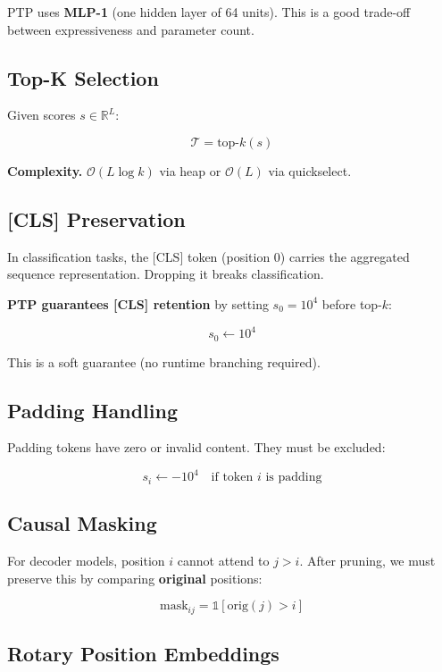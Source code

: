 PTP uses \textbf{MLP-1} (one hidden layer of 64 units). This is a good 
trade-off between expressiveness and parameter count.

\subsection{Top-K Selection}

Given scores $s \in \mathbb{R}^L$:

\[
\mathcal{T} = \text{top-}k(s)
\tag{3.4}
\]

\textbf{Complexity.} $\mathcal{O}(L \log k)$ via heap or $\mathcal{O}(L)$ via 
quickselect.

\subsection{[CLS] Preservation}

In classification tasks, the [CLS] token (position 0) carries the 
aggregated sequence representation. Dropping it breaks classification.

\textbf{PTP guarantees [CLS] retention} by setting $s_0 = 10^4$ before top-$k$:

\[
s_0 \leftarrow 10^4
\tag{3.5}
\]

This is a soft guarantee (no runtime branching required).

\subsection{Padding Handling}

Padding tokens have zero or invalid content. They must be excluded:

\[
s_i \leftarrow -10^4 \quad \text{if token } i \text{ is padding}
\tag{3.6}
\]

\subsection{Causal Masking}

For decoder models, position $i$ cannot attend to $j > i$. After pruning, 
we must preserve this by comparing \textbf{original} positions:

\[
\text{mask}_{ij} = \mathbb{1}[\text{orig}(j) > i]
\tag{3.7}
\]

\subsection{Rotary Position Embeddings}

